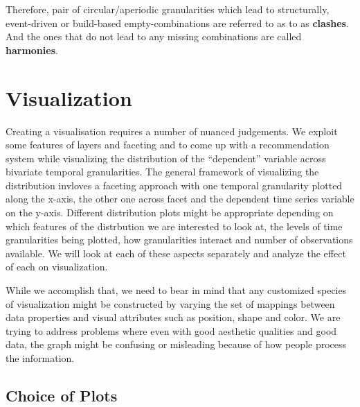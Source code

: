 \documentclass[12pt]{article}
\begin{document}
Therefore, pair of circular/aperiodic granularities which lead to
structurally, event-driven or build-based empty-combinations are
referred to as to as \textbf{clashes}. And the ones that do not lead to
any missing combinations are called \textbf{harmonies}.

\hypertarget{sec:visualization}{%
\section{Visualization}\label{sec:visualization}}

Creating a visualisation requires a number of nuanced judgements. We
exploit some features of layers and faceting \citep{Wilkinson1999-nk}
and \citep{Wickham2009-pk} to come up with a recommendation system while
visualizing the distribution of the ``dependent'' variable across
bivariate temporal granularities. The general framework of visualizing
the distribution invloves a faceting approach with one temporal
granularity plotted along the x-axis, the other one across facet and the
dependent time series variable on the y-axis. Different distribution
plots might be appropriate depending on which features of the
distrbution we are interested to look at, the levels of time
granularities being plotted, how granularities interact and number of
observations available. We will look at each of these aspects separately
and analyze the effect of each on visualization.

While we accomplish that, we need to bear in mind that any customized
species of visualization might be constructed by varying the set of
mappings between data properties and visual attributes such as position,
shape and color. We are trying to address problems where even with good
aesthetic qualities and good data, the graph might be confusing or
misleading because of how people process the information.

\hypertarget{choice-of-plots}{%
\subsection{Choice of Plots}\label{choice-of-plots}}
\end{document}
